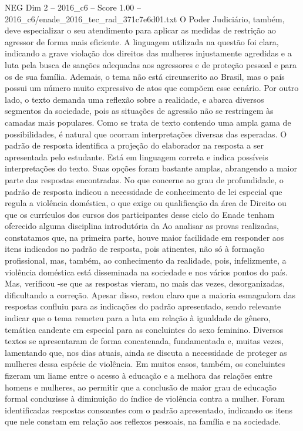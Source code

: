 \begin{textsample}{NEG Dim 2 – 2016\_c6 – Score 1.00 – 2016\_c6/enade\_2016\_tec\_rad\_371c7e6d01.txt}
O Poder Judiciário, também, deve especializar o seu atendimento para aplicar as medidas de restrição ao agressor de forma mais eficiente.
A linguagem utilizada na questão foi clara, indicando a grave violação dos direitos das mulheres injustamente agredidas e a luta pela busca de sanções adequadas aos agressores e de proteção pessoal e para os de sua família.
Ademais, o tema não está circunscrito ao Brasil, mas o país possui um número muito expressivo de atos que compõem esse cenário.
Por outro lado, o texto demanda uma reflexão sobre a realidade, e abarca diversos segmentos da sociedade, pois as situações de agressão não se restringem às camadas mais populares.
Como se trata de texto contendo uma ampla gama de possibilidades, é natural que ocorram interpretações diversas das esperadas.
O padrão de resposta identifica a projeção do elaborador na resposta a ser apresentada pelo estudante.
Está em linguagem correta e indica possíveis interpretações do texto.
Suas opções foram bastante amplas, abrangendo a maior parte das respostas encontradas.
No que concerne ao grau de profundidade, o padrão de resposta indicou a necessidade de conhecimento de lei especial que regula a violência doméstica, o que exige ou qualificação da área de Direito ou que os currículos dos cursos dos participantes desse ciclo do Enade tenham oferecido alguma disciplina introdutória da Ao analisar as provas realizadas, constatamos que, na primeira parte, houve maior facilidade em responder aos itens indicados no padrão de resposta, pois atinentes, não só à formação profissional, mas, também, ao conhecimento da realidade, pois, infelizmente, a violência doméstica está disseminada na sociedade e nos vários pontos do país.
Mas, verificou -se que as respostas vieram, no mais das vezes, desorganizadas, dificultando a correção.
Apesar disso, restou claro que a maioria esmagadora das respostas confluiu para as indicações do padrão apresentado, sendo relevante indicar que o tema remeteu para a luta em relação à igualdade de gênero, temática candente em especial para as concluintes do sexo feminino.
Diversos textos se apresentaram de forma concatenada, fundamentada e, muitas vezes, lamentando que, nos dias atuais, ainda se discuta a necessidade de proteger as mulheres dessa espécie de violência.
Em muitos casos, também, os concluintes fizeram um liame entre o acesso à educação e a melhora das relações entre homens e mulheres, ao permitir que a conclusão de maior grau de educação formal conduzisse à diminuição do índice de violência contra a mulher.
Foram identificadas respostas consoantes com o padrão apresentado, indicando os itens que nele constam em relação aos reflexos pessoais, na família e na sociedade.

\end{textsample}
